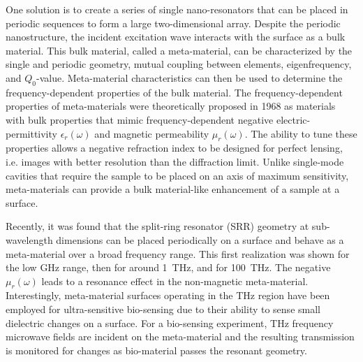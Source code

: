 One solution is to create a series of single nano-resonators that can be placed in periodic sequences to form a large two-dimensional array. Despite the periodic nanostructure, the incident excitation wave interacts with the surface as a bulk material. \cite{Yen04} This bulk material, called a meta-material, can be characterized by the single and periodic geometry, mutual coupling between elements, eigenfrequency, and $Q_0$-value. Meta-material characteristics can then be used to determine the frequency-dependent properties of the bulk material. The frequency-dependent properties of meta-materials were theoretically proposed in 1968 as materials with bulk properties that mimic frequency-dependent negative electric-permittivity $\epsilon_r(\omega)$ and magnetic permeability $\mu_r(\omega)$. \cite{Veselago68} The ability to tune these properties allows a negative refraction index to be designed for perfect lensing, i.e. images with better resolution than the diffraction limit. \cite{Smith04} Unlike single-mode cavities that require the sample to be placed on an axis of maximum sensitivity, meta-materials can provide a bulk material-like enhancement of a sample at a surface.

Recently, it was found that the split-ring resonator (SRR) geometry at sub-wavelength dimensions can be placed periodically on a surface and behave as a meta-material over a broad frequency range. \cite{Smith00,Yen04,Linden04} This first realization was shown for the low GHz range, \cite{Smith00} then for around 1~THz, \cite{Yen04} and for 100~THz. \cite{Linden04} The negative $\mu_r(\omega)$ leads to a resonance effect in the non-magnetic meta-material. Interestingly, meta-material surfaces operating in the THz region have been employed for ultra-sensitive bio-sensing due to their ability to sense small dielectric changes on a surface. \cite{C7NR03824K} For a bio-sensing experiment, THz frequency microwave fields are incident on the meta-material and the resulting transmission is monitored for changes as bio-material passes the resonant geometry. \cite{Lee2017}


